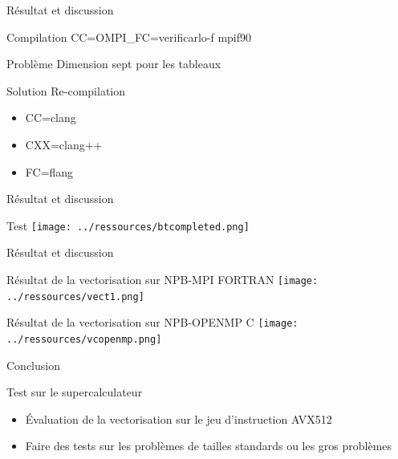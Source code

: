 \documentclass{beamer}
\begin{document}
\begin{frame}{ Résultat et discussion}

  \begin{block}{Compilation}
    CC=OMPI\_FC=verificarlo-f  mpif90
  \end{block}
  
  \begin{block}{Problème}
    Dimension sept pour les tableaux
  \end{block}
  
  \begin{block}{Solution}
    Re-compilation
    \begin{itemize}
    \item CC=clang
    \item CXX=clang++
    \item FC=flang
    \end{itemize}
  \end{block}

\end{frame}

\begin{frame}{Résultat et discussion}

  \begin{block}{Test}
    \texttt{[image: ../ressources/btcompleted.png]}
  \end{block}

\end{frame}

\begin{frame}{Résultat et discussion}

  \begin{block}{Résultat de la vectorisation sur NPB-MPI FORTRAN}
    \texttt{[image: ../ressources/vect1.png]}
  \end{block}
  
  \begin{block}{Résultat de la vectorisation sur NPB-OPENMP C}
    \texttt{[image: ../ressources/vcopenmp.png]}
  \end{block}

\end{frame}

\begin{frame}{ Conclusion}

  \begin{block}{Test sur le supercalculateur}
    \begin{itemize}
    \item Évaluation de la vectorisation sur le jeu d'instruction AVX512
    \item Faire des tests sur les problèmes de tailles standards ou les gros problèmes
    \end{itemize}
  \end{block}
  
\end{frame}
\end{document}
